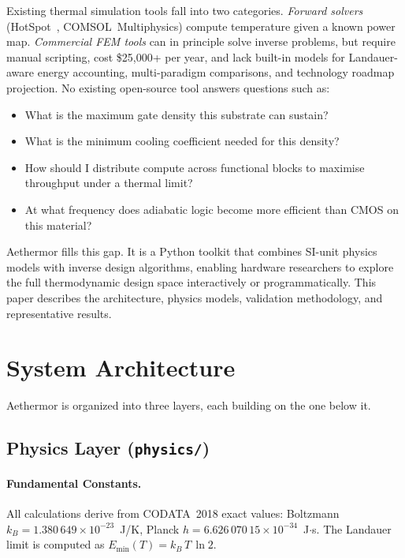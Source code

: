 \documentclass[11pt,twocolumn]{article}
\begin{document}
Existing thermal simulation tools fall into two categories.
\emph{Forward solvers} (HotSpot~\cite{skadron2004},
COMSOL~Multiphysics) compute temperature given a known power map.
\emph{Commercial FEM tools} can in principle solve inverse problems,
but require manual scripting, cost \$25{,}000+ per year, and lack
built-in models for Landauer-aware energy accounting, multi-paradigm
comparisons, and technology roadmap projection. No existing open-source
tool answers questions such as:
\begin{itemize}[nosep]
  \item What is the maximum gate density this substrate can sustain?
  \item What is the minimum cooling coefficient needed for this density?
  \item How should I distribute compute across functional blocks to
        maximise throughput under a thermal limit?
  \item At what frequency does adiabatic logic become more efficient
        than CMOS on this material?
\end{itemize}

Aethermor fills this gap. It is a Python toolkit that combines
SI-unit physics models with inverse design algorithms, enabling
hardware researchers to explore the full thermodynamic design space
interactively or programmatically. This paper describes the
architecture, physics models, validation methodology, and
representative results.


\section{System Architecture}
\label{sec:arch}

Aethermor is organized into three layers, each building on the one
below it.

\subsection{Physics Layer (\texttt{physics/})}

\paragraph{Fundamental Constants.}
All calculations derive from CODATA~2018 exact values: Boltzmann
$k_B = 1.380\,649 \times 10^{-23}$~J/K, Planck
$h = 6.626\,070\,15 \times 10^{-34}$~J$\cdot$s. The Landauer limit is
computed as $E_{\min}(T) = k_B \, T \, \ln 2$.
\end{document}
